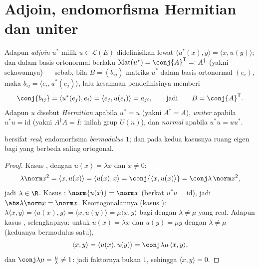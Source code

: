 \section{Adjoin, endomorfisma Hermitian dan uniter}

\begin{definition}\label{def:b2:hermitian:adjoint}
Adapun \emph{adjoin} $u^*$ milik $u \in \mathcal{L}(E)$ didefinisikan lewat
$\langle u^*(x), y\rangle = \langle x, u(y)\rangle$; dan dalam basis
ortonormal berlaku $\operatorname{Mat}(u^*) = \conj{A}^{\mathsf T} =:
A^{\dagger}$ (yakni  sekawannya) --- sebab, bila $B =
(b_{ij})$ matriks $u^*$ dalam basis ortonormal
$(e_i)$, maka $b_{ij} = \langle e_i, u^*(e_j)\rangle$, lalu
kesamaan pendefinisinya memberi
\[
\conj{b_{ij}}
= \langle u^*(e_j), e_i\rangle
= \langle e_j, u(e_i)\rangle = a_{ji} ,
\qquad\text{jadi}\qquad
B = \conj{A}^{\mathsf T} .
\] Adapun $u$ disebut
\emph{Hermitian} apabila $u^* = u$
(yakni $A^\dagger = A$), \emph{uniter} apabila $u^*u =
\mathrm{id}$ (yakni $A^\dagger A = I$: inilah grup $U(n)$), dan
\emph{normal} apabila $u^*u = uu^*$.
\end{definition}

\begin{proposition}\label{prop:b2:hermitian:eigenvalues}
  bersifat \emph{real};
 endomorfisma  \emph{bermodulus $1$}; dan pada
kedua kasusnya ruang eigen bagi  yang berbeda saling ortogonal.
\end{proposition}

\begin{proof}
Kasus , dengan $u(x) = \lambda x$ dan $x \neq 0$:
\[
\lambda \norm x^2 = \langle x, u(x)\rangle = \langle u(x), x\rangle
= \conj{\langle x, u(x)\rangle} = \conj\lambda\,\norm x^2 ,
\]
jadi $\lambda \in \R$. Kasus : $\norm{u(x)} = \norm x$ (berkat $u^*u =
\mathrm{id}$), jadi $\abs\lambda\norm x = \norm x$. Keortogonalannya
(kasus ): $\lambda\langle x, y\rangle = \langle u(x),
y\rangle = \langle x, u(y)\rangle = \mu\langle x, y\rangle$ bagi
 dengan $\lambda \neq \mu$ yang real. Adapun kasus ,
selengkapnya: untuk $u(x) = \lambda x$ dan $u(y) = \mu y$ dengan $\lambda \neq
\mu$ (keduanya bermodulus satu),
\[
\langle x, y\rangle = \langle u(x), u(y)\rangle
= \conj\lambda\mu\,\langle x, y\rangle ,
\]
dan $\conj\lambda\mu = \frac{\mu}{\lambda} \neq 1$: jadi faktornya
bukan $1$, sehingga $\langle x, y\rangle = 0$.
\end{proof}

